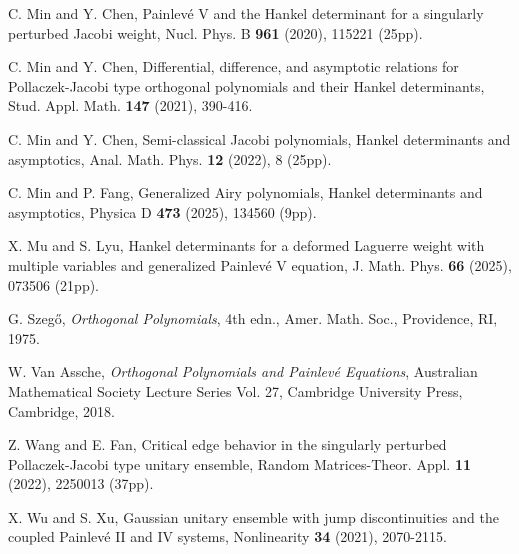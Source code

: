 \documentclass[12pt,a4paper]{article}    %
\numberwithin{equation}{section}
\begin{document}
\begin{thebibliography}{}
C. Min and Y. Chen,  Painlev\'{e} V and the Hankel determinant for a singularly
perturbed Jacobi weight, Nucl. Phys. B {\bf 961} (2020), 115221 (25pp).

C. Min and Y. Chen,  Differential, difference, and asymptotic relations for Pollaczek-Jacobi type orthogonal polynomials and their Hankel determinants, Stud. Appl. Math. {\bf 147} (2021), 390-416.

C. Min and Y. Chen, Semi-classical Jacobi polynomials, Hankel determinants and asymptotics, Anal. Math. Phys. {\bf 12} (2022), 8 (25pp).
		
    	{C. Min and P. Fang},  Generalized Airy polynomials, Hankel determinants and asymptotics, Physica D {\bf 473} (2025), 134560 (9pp).
		
		{X. Mu and S. Lyu}, Hankel determinants for a deformed Laguerre weight with multiple variables and generalized Painlev\'{e} V equation, J. Math. Phys. {\bf 66} (2025), 073506 (21pp).
	
		
		{G. Szeg\H{o}}, {\em Orthogonal Polynomials}, {4th edn.}, {Amer. Math. Soc.}, {Providence, RI}, {1975}.
		
	
		{W. Van Assche}, {\em Orthogonal Polynomials and Painlev\'e Equations},  {Australian Mathematical Society Lecture Series Vol. 27}, {Cambridge University Press}, Cambridge, 2018.

Z. Wang and E. Fan, Critical edge behavior in the singularly perturbed Pollaczek-Jacobi type unitary ensemble, Random Matrices-Theor. Appl. {\bf 11} (2022), 2250013 (37pp).

X. Wu and S. Xu,  Gaussian unitary ensemble with jump discontinuities and the coupled Painlev\'{e} II and IV systems, Nonlinearity {\bf 34} (2021), 2070-2115.

		
		
	
		
	\end{thebibliography}
	
	
	
\end{document}
